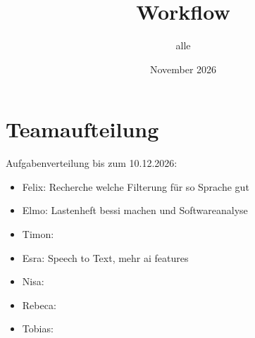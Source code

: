 \documentclass{article}
\title{Workflow}
\author{alle}
\date{November 2026}
\begin{document}
\maketitle

\section{Teamaufteilung}

Aufgabenverteilung bis zum 10.12.2026:
\begin{itemize}
    \item Felix: Recherche welche Filterung für so Sprache gut 
    \item Elmo: Lastenheft bessi machen und Softwareanalyse
    \item Timon:
    \item Esra: Speech to Text, mehr ai features 
    \item Nisa:
    \item Rebeca:
    \item Tobias:
\end{itemize}
\end{document}
